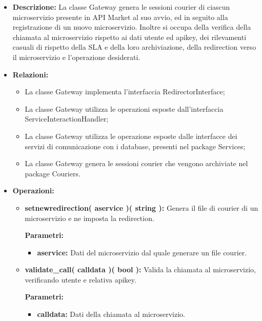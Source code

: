 \begin{itemize}
	\item \textbf{Descrizione:} La classe Gateway genera le sessioni courier di ciascun microservizio presente in API Market al suo avvio, ed in seguito alla registrazione di un nuovo microservizio. Inoltre si occupa della verifica della chiamata al microservizio rispetto ai dati utente ed apikey, dei rilevamenti casuali di rispetto della SLA e della loro archiviazione, della redirection verso il microservizio e l'operazione desiderati.
	\item \textbf{Relazioni:}
		\begin{itemize}
			\item La classe Gateway implementa l'interfaccia RedirectorInterface;
			\item La classe Gateway utilizza le operazioni esposte dall'interfaccia ServiceInteractionHandler;
			\item La classe Gateway utilizza le operazione esposte dalle interfacce dei servizi di comunicazione con i database, presenti nel package Services;
			\item La classe Gateway genera le sessioni courier che vengono archiviate nel package Couriers.
		\end{itemize}
	\item \textbf{Operazioni:}
		\begin{itemize}
			\item \textbf{setnewredirection( aservice )( string ):} Genera il file di courier di un microservizio e ne imposta la redirection.
				\begin{description}
    				\item[\textbf{Parametri:}]
				\end{description}
				\begin{itemize}
					\item \textbf{aservice:} Dati del microservizio dal quale generare un file courier. 
				\end{itemize}
			\item \textbf{validate\_call( calldata )( bool ):} Valida la chiamata al microservizio, verificando utente e relativa apikey. 
				\begin{description}
    				\item[\textbf{Parametri:}]
				\end{description}
				\begin{itemize}
					\item \textbf{calldata:} Dati della chiamata al microservizio.
				\end{itemize}

\end{itemize}
\end{itemize}
